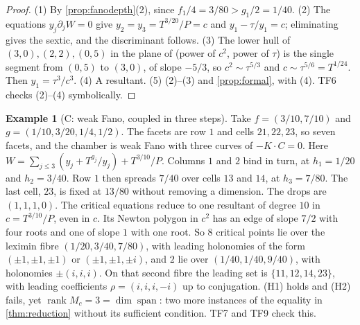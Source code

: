 \documentclass[11pt]{article}
\theoremstyle{definition}\newtheorem{definition}[theorem]{Definition}\newtheorem{remark}[theorem]{Remark}\newtheorem{example}[theorem]{Example}\newtheorem{problem}[theorem]{Open problem}\crefname{problem}{Problem}{Problems}
\begin{document}
\begin{proof}
(1) By \cref{prop:fanodepth}(2), since $f_1/4=3/80>g_1/2=1/40$. (2) The equations $y_j\partial_jW=0$ give $y_2=y_3=T^{3/20}/P=c$ and $y_1-\tau/y_1=c$; eliminating gives the sextic, and the
discriminant follows. (3) The lower hull of $(3,0),(2,2),(0,5)$ in the plane of (power of $c^2$, power of $\tau$) is the single segment from $(0,5)$ to $(3,0)$, of slope $-5/3$, so
$c^2\sim\tau^{5/3}$ and $c\sim\tau^{5/6}=T^{1/24}$. Then $y_1=\tau^3/c^3$. (4) A resultant. (5) (2)--(3) and \cref{prop:formal}, with (4). TF6 checks (2)--(4) symbolically.
\end{proof}

\begin{example}[C: weak Fano, coupled in three steps]\label{ex:C24}
Take $f=(3/10,7/10)$ and $g=(1/10,3/20,1/4,1/2)$. The facets are row $1$ and cells $21,22,23$, so seven facets, and the chamber is weak Fano with three curves of $-K\cdot C=0$. Here
$W=\sum_{j\le3}(y_j+T^{g_j}/y_j)+T^{3/10}/P$. Columns $1$ and $2$ bind in turn, at $h_1=1/20$ and $h_2=3/40$. Row $1$ then spreads $7/40$ over cells $13$ and $14$, at $h_3=7/80$. The last cell, $23$,
is fixed at $13/80$ without removing a dimension. The drops are $(1,1,1,0)$. The critical equations reduce to one resultant of degree $10$ in $c=T^{3/10}/P$, even in $c$. Its Newton polygon in $c^2$
has an edge of slope $7/2$ with four roots and one of slope $1$ with one root. So $8$ critical points lie over the leximin fibre $(1/20,3/40,7/80)$, with leading holonomies of the form
$(\pm1,\pm1,\pm1)$ or $(\pm1,\pm1,\pm i)$, and $2$ lie over $(1/40,1/40,9/40)$, with holonomies $\pm(i,i,i)$. On that second fibre the leading set is $\{11,12,14,23\}$, with leading coefficients
$\rho=(i,i,i,-i)$ up to conjugation. (H1) holds and (H2) fails, yet $\operatorname{rank}M_c=3=\dim\operatorname{span}$: two more instances of the equality in \cref{thm:reduction} without its sufficient
condition. TF7 and TF9 check this.
\end{example}
\end{document}
